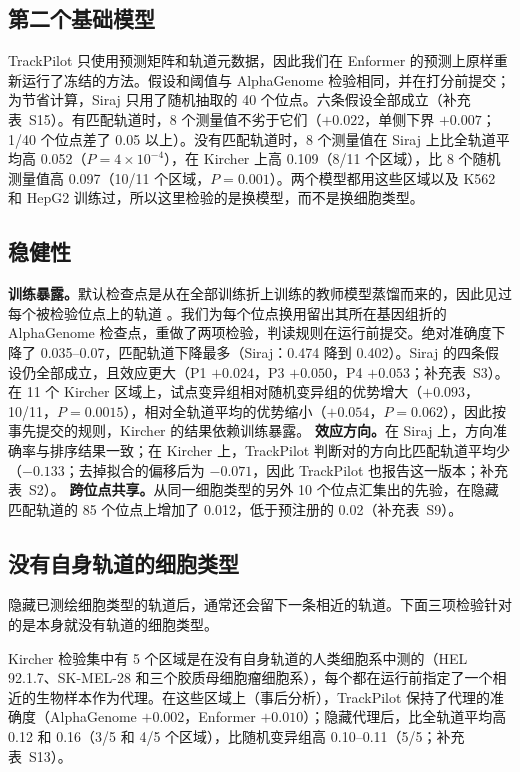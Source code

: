 \documentclass[webpdf,contemporary,large]{oup-authoring-template}
\newcommand{\tp}{TrackPilot}
\begin{document}
\subsection{第二个基础模型}
\label{sec:general}

\tp{} 只使用预测矩阵和轨道元数据，因此我们在 Enformer 的预测上原样重新运行了冻结的方法。假设和阈值与 AlphaGenome 检验相同，并在打分前提交；为节省计算，Siraj 只用了随机抽取的 40 个位点。六条假设全部成立（补充表~S15）。有匹配轨道时，8 个测量值不劣于它们（$+0.022$，单侧下界 $+0.007$；1/40 个位点差了 0.05 以上）。没有匹配轨道时，8 个测量值在 Siraj 上比全轨道平均高 0.052（$P = 4\times10^{-4}$），在 Kircher 上高 0.109（8/11 个区域），比 8 个随机测量值高 0.097（10/11 个区域，$P = 0.001$）。两个模型都用这些区域以及 K562 和 HepG2 训练过，所以这里检验的是换模型，而不是换细胞类型。

\subsection{稳健性}

\textbf{训练暴露。}默认检查点是从在全部训练折上训练的教师模型蒸馏而来的，因此见过每个被检验位点上的轨道 \citep{avsec2026alphagenome}。我们为每个位点换用留出其所在基因组折的 AlphaGenome 检查点，重做了两项检验，判读规则在运行前提交。绝对准确度下降了 0.035--0.07，匹配轨道下降最多（Siraj：0.474 降到 0.402）。Siraj 的四条假设仍全部成立，且效应更大（P1 $+0.024$，P3 $+0.050$，P4 $+0.053$；补充表~S3）。在 11 个 Kircher 区域上，试点变异组相对随机变异组的优势增大（$+0.093$，10/11，$P = 0.0015$），相对全轨道平均的优势缩小（$+0.054$，$P = 0.062$），因此按事先提交的规则，Kircher 的结果依赖训练暴露。
\textbf{效应方向。}在 Siraj 上，方向准确率与排序结果一致；在 Kircher 上，\tp{} 判断对的方向比匹配轨道平均少（$-0.133$；去掉拟合的偏移后为 $-0.071$，因此 \tp{} 也报告这一版本；补充表~S2）。
\textbf{跨位点共享。}从同一细胞类型的另外 10 个位点汇集出的先验，在隐藏匹配轨道的 85 个位点上增加了 0.012，低于预注册的 0.02（补充表~S9）。

\subsection{没有自身轨道的细胞类型}
\label{sec:unprofiled}

隐藏已测绘细胞类型的轨道后，通常还会留下一条相近的轨道。下面三项检验针对的是本身就没有轨道的细胞类型。

Kircher 检验集中有 5 个区域是在没有自身轨道的人类细胞系中测的（HEL 92.1.7、SK-MEL-28 和三个胶质母细胞瘤细胞系），每个都在运行前指定了一个相近的生物样本作为代理。在这些区域上（事后分析），\tp{} 保持了代理的准确度（AlphaGenome $+0.002$，Enformer $+0.010$）；隐藏代理后，比全轨道平均高 0.12 和 0.16（3/5 和 4/5 个区域），比随机变异组高 0.10--0.11（5/5；补充表~S13）。
\end{document}
